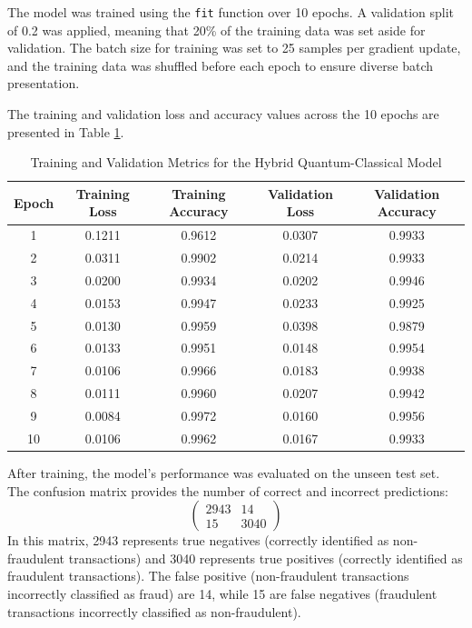 \documentclass[10pt]{article}
\begin{document}
The model was trained using the \texttt{fit} function over 10 epochs. A validation split of 0.2 was applied, meaning that 20\% of the training data was set aside for validation. The batch size for training was set to 25 samples per gradient update, and the training data was shuffled before each epoch to ensure diverse batch presentation.

The training and validation loss and accuracy values across the 10 epochs are presented in Table \ref{tab:training_validation_metrics}.

\begin{table}[H]
    \centering
    \caption{Training and Validation Metrics for the Hybrid Quantum-Classical Model}
    \label{tab:training_validation_metrics}
    \begin{tabular}{|c|c|c|c|c|}
        \hline
        \textbf{Epoch} & \textbf{Training Loss} & \textbf{Training Accuracy} & \textbf{Validation Loss} & \textbf{Validation Accuracy} \\
        \hline
        1 & 0.1211 & 0.9612 & 0.0307 & 0.9933 \\
        2 & 0.0311 & 0.9902 & 0.0214 & 0.9933 \\
        3 & 0.0200 & 0.9934 & 0.0202 & 0.9946 \\
        4 & 0.0153 & 0.9947 & 0.0233 & 0.9925 \\
        5 & 0.0130 & 0.9959 & 0.0398 & 0.9879 \\
        6 & 0.0133 & 0.9951 & 0.0148 & 0.9954 \\
        7 & 0.0106 & 0.9966 & 0.0183 & 0.9938 \\
        8 & 0.0111 & 0.9960 & 0.0207 & 0.9942 \\
        9 & 0.0084 & 0.9972 & 0.0160 & 0.9956 \\
        10 & 0.0106 & 0.9962 & 0.0167 & 0.9933 \\
        \hline
    \end{tabular}
\end{table}

After training, the model's performance was evaluated on the unseen test set. The confusion matrix provides the number of correct and incorrect predictions:
\[
\begin{pmatrix}
    2943 & 14 \\
    15 & 3040
\end{pmatrix}
\]
In this matrix, 2943 represents true negatives (correctly identified as non-fraudulent transactions) and 3040 represents true positives (correctly identified as fraudulent transactions). The false positive (non-fraudulent transactions incorrectly classified as fraud) are 14, while 15 are false negatives (fraudulent transactions incorrectly classified as non-fraudulent).
\end{document}
